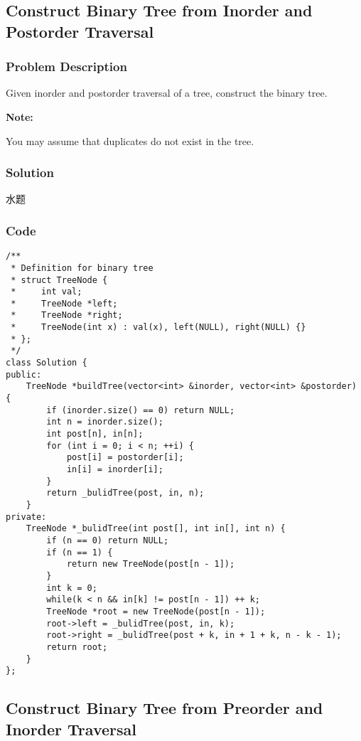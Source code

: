 \documentclass[courier]{article}
\begin{document}
\begin{CJK*}{UTF8}{gkai}
\subsection{ Construct Binary Tree from Inorder and Postorder Traversal }

\subsubsection*{Problem Description}
Given inorder and postorder traversal of a tree, construct the binary tree.

\textbf{Note:}


You may assume that duplicates do not exist in the tree.



\subsubsection*{Solution}
水题

\subsubsection*{Code}
\begin{lstlisting}
/**
 * Definition for binary tree
 * struct TreeNode {
 *     int val;
 *     TreeNode *left;
 *     TreeNode *right;
 *     TreeNode(int x) : val(x), left(NULL), right(NULL) {}
 * };
 */
class Solution {
public:
    TreeNode *buildTree(vector<int> &inorder, vector<int> &postorder) {
        if (inorder.size() == 0) return NULL;
        int n = inorder.size();
        int post[n], in[n];
        for (int i = 0; i < n; ++i) {
            post[i] = postorder[i];
            in[i] = inorder[i];
        }
        return _bulidTree(post, in, n);
    }
private:
    TreeNode *_bulidTree(int post[], int in[], int n) {
        if (n == 0) return NULL;
        if (n == 1) {
            return new TreeNode(post[n - 1]);
        }
        int k = 0;
        while(k < n && in[k] != post[n - 1]) ++ k;
        TreeNode *root = new TreeNode(post[n - 1]);
        root->left = _bulidTree(post, in, k);
        root->right = _bulidTree(post + k, in + 1 + k, n - k - 1);
        return root;
    }
}; 
\end{lstlisting}


\subsection{ Construct Binary Tree from Preorder and Inorder Traversal }


\end{CJK*}
\end{document}
